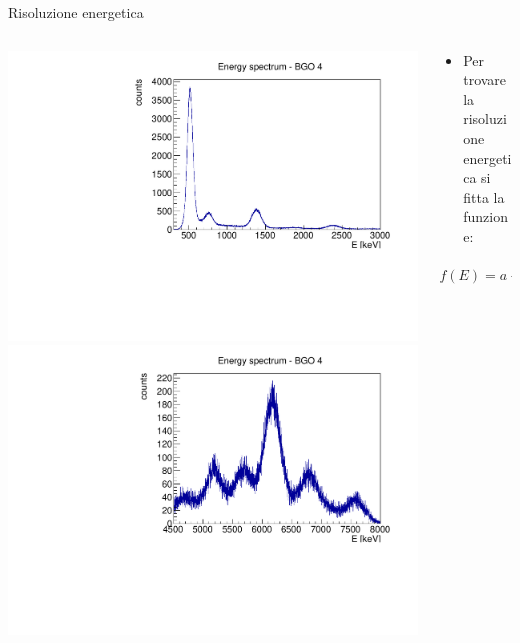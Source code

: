 \documentclass [xcolor=svgnames, 9pt] {beamer}
\begin{document}
\begin{frame}{Risoluzione energetica}
	\begin{columns}
		\begin{column}{0.5\textwidth}
			\centering
				\includegraphics[width=\textwidth]{img/resolution_hist1.pdf}
				\centering
				\includegraphics[width=\textwidth]{img/resolution_hist2.pdf}
		\end{column}
		\begin{column}{0.5\textwidth}
			\begin{itemize}
					\item Per trovare la risoluzione energetica si fitta la funzione:
				\end{itemize}
				\begin{equation*}
					f(E) = a + \dfrac{b}{\sqrt{E}}
			\end{equation*}	
			\centering

\end{column}
\end{columns}
\end{frame}
\end{document}
